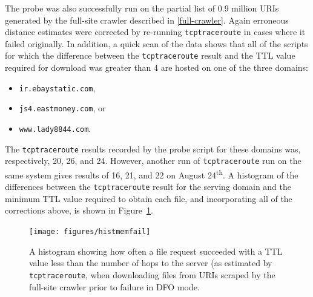 The probe was also successfully run on the partial list of 0.9 million URIs generated by the full-site crawler described in \autoref{full-crawler}.
Again erroneous distance estimates were corrected by re-running \texttt{tcptraceroute} in cases where it failed originally.
In addition, a quick scan of the data shows that all of the scripts for which the difference between the \texttt{tcptraceroute} result and the TTL value required for download was greater than 4 are hosted on one of the three domains:
\begin{itemize}\addtolength{\itemsep}{-.35\baselineskip}
	\item \texttt{ir.ebaystatic.com},
	\item \texttt{js4.eastmoney.com}, or
	\item \texttt{www.lady8844.com}.
\end{itemize}
The \texttt{tcptraceroute} results recorded by the probe script for these domains was, respectively, 20, 26, and 24.
However, another run of \texttt{tcptraceroute} run on the same system gives results of 16, 21, and 22 on August 24\textsuperscript{th}.
A histogram of the differences between the \texttt{tcptraceroute} result for the serving domain and the minimum TTL value required to obtain each file, and incorporating all of the corrections above, is shown in Figure~\ref{fig_histmemfail}.
\begin{figure}
	\texttt{[image: figures/histmemfail]}
	\caption{
		A histogram showing how often a file request succeeded with a TTL value less than the number of hops to the server (as estimated by \texttt{tcptraceroute}, when downloading files from URIs scraped by the full-site crawler prior to failure in DFO mode.
	}
	\label{fig_histmemfail}
\end{figure}